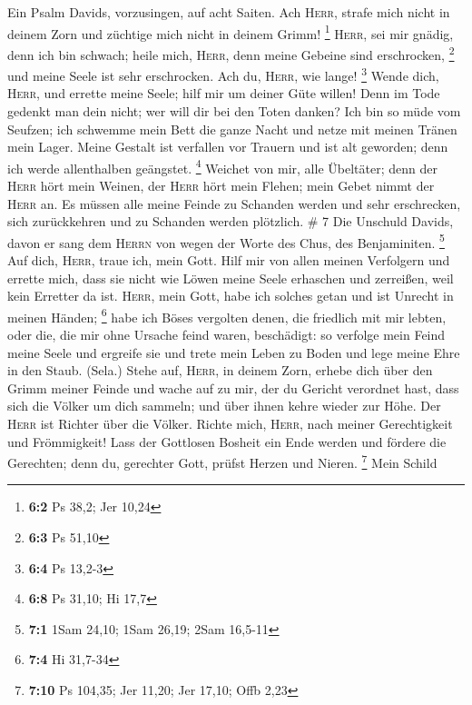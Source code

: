  Ein Psalm Davids, vorzusingen, auf acht Saiten.
 Ach \textsc{Herr}, strafe mich nicht in deinem Zorn und
züchtige mich nicht in deinem Grimm! \footnote{\textbf{6:2} Ps 38,2; Jer
  10,24}  \textsc{Herr}, sei mir gnädig, denn ich bin
schwach; heile mich, \textsc{Herr}, denn meine Gebeine sind erschrocken,
\footnote{\textbf{6:3} Ps 51,10}  und meine Seele ist sehr
erschrocken. Ach du, \textsc{Herr}, wie lange! \footnote{\textbf{6:4} Ps
  13,2-3}  Wende dich, \textsc{Herr}, und errette meine
Seele; hilf mir um deiner Güte willen!  Denn im Tode
gedenkt man dein nicht; wer will dir bei den Toten danken?
 Ich bin so müde vom Seufzen; ich schwemme mein Bett die
ganze Nacht und netze mit meinen Tränen mein Lager.  Meine
Gestalt ist verfallen vor Trauern und ist alt geworden; denn ich werde
allenthalben geängstet. \footnote{\textbf{6:8} Ps 31,10; Hi 17,7}
 Weichet von mir, alle Übeltäter; denn der \textsc{Herr}
hört mein Weinen,  der \textsc{Herr} hört mein Flehen;
mein Gebet nimmt der \textsc{Herr} an.  Es müssen alle
meine Feinde zu Schanden werden und sehr erschrecken, sich zurückkehren
und zu Schanden werden plötzlich. \# 7  Die Unschuld
Davids, davon er sang dem \textsc{Herrn} von wegen der Worte des Chus,
des Benjaminiten. \footnote{\textbf{7:1} 1Sam 24,10; 1Sam 26,19; 2Sam
  16,5-11}  Auf dich, \textsc{Herr}, traue ich, mein Gott.
Hilf mir von allen meinen Verfolgern und errette mich, 
dass sie nicht wie Löwen meine Seele erhaschen und zerreißen, weil kein
Erretter da ist.  \textsc{Herr}, mein Gott, habe ich
solches getan und ist Unrecht in meinen Händen; \footnote{\textbf{7:4}
  Hi 31,7-34}  habe ich Böses vergolten denen, die
friedlich mit mir lebten, oder die, die mir ohne Ursache feind waren,
beschädigt:  so verfolge mein Feind meine Seele und
ergreife sie und trete mein Leben zu Boden und lege meine Ehre in den
Staub. (Sela.)  Stehe auf, \textsc{Herr}, in deinem Zorn,
erhebe dich über den Grimm meiner Feinde und wache auf zu mir, der du
Gericht verordnet hast,  dass sich die Völker um dich
sammeln; und über ihnen kehre wieder zur Höhe.  Der
\textsc{Herr} ist Richter über die Völker. Richte mich, \textsc{Herr},
nach meiner Gerechtigkeit und Frömmigkeit!  Lass der
Gottlosen Bosheit ein Ende werden und fördere die Gerechten; denn du,
gerechter Gott, prüfst Herzen und Nieren. \footnote{\textbf{7:10} Ps
  104,35; Jer 11,20; Jer 17,10; Offb 2,23}  Mein Schild
